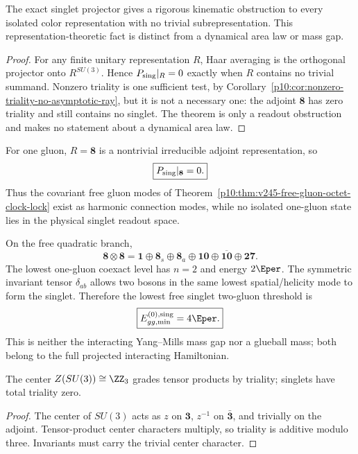 \documentclass[12pt,a4paper]{article}
\begin{document}
\begin{theorem}
\label{p10:thm:kinematic-color-confinement}
The exact singlet projector gives a rigorous kinematic obstruction to every
isolated color representation with no trivial subrepresentation.  This
representation-theoretic fact is distinct from a dynamical area law or mass
gap.
\end{theorem}
\begin{proof}
For any finite unitary representation \(R\), Haar averaging is the orthogonal
projector onto \(R^{SU(3)}\).  Hence \(P_{\rm sing}|_R=0\) exactly when
\(R\) contains no trivial summand.  Nonzero triality is one sufficient test,
by Corollary~\ref{p10:cor:nonzero-triality-no-asymptotic-ray}, but it is not a
necessary one: the adjoint \(\mathbf8\) has zero triality and still contains no
singlet.  The theorem is only a readout obstruction and makes no statement
about a dynamical area law.
\end{proof}

\begin{corollary}
\label{p10:cor:v245-isolated-gluon-no-singlet-ray}
For one gluon, \(R=\mathbf8\) is a nontrivial irreducible adjoint
representation, so
\[
 \boxed{P_{\rm sing}|_{\mathbf8}=0.}
\]
Thus the covariant free gluon modes of
Theorem~\ref{p10:thm:v245-free-gluon-octet-clock-lock} exist as harmonic
connection modes, while no isolated one-gluon state lies in the physical
singlet readout space.
\end{corollary}

\begin{corollary}
\label{p10:cor:v245-free-two-gluon-singlet-threshold}
On the free quadratic branch,
\[
 \mathbf8\otimes\mathbf8
 =\mathbf1\oplus\mathbf8_s\oplus\mathbf8_a
  \oplus\mathbf{10}\oplus\overline{\mathbf{10}}\oplus\mathbf{27}.
\]
The lowest one-gluon coexact level has \(n=2\) and energy \(2\Eper\).  The
symmetric invariant tensor \(\delta_{ab}\) allows two bosons in the same
lowest spatial/helicity mode to form the singlet.  Therefore the lowest free
singlet two-gluon threshold is
\[
 \boxed{E_{gg,{\rm min}}^{(0),{\rm sing}}=4\Eper.}
\]
This is neither the interacting Yang--Mills mass gap nor a glueball mass; both
belong to the full projected interacting Hamiltonian.
\end{corollary}

\begin{theorem}
\label{p10:thm:center-triality-superselection}
The center \(Z(SU(3))\cong\ZZ_3\) grades tensor products by triality; singlets have total triality zero.
\end{theorem}
\begin{proof}
The center of $SU(3)$ acts as $z$ on $\mathbf3$, $z^{-1}$ on $\bar{\mathbf3}$, and trivially on the adjoint.  Tensor-product center characters multiply, so triality is additive modulo three.  Invariants must carry the trivial center character.
\end{proof}
\end{document}
